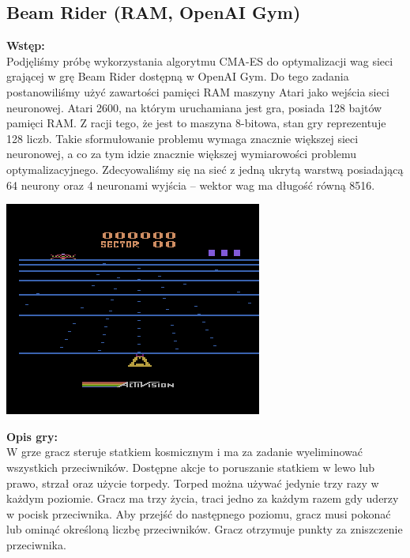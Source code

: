 \documentclass[polish]{article}
\begin{document}
\begin{roboto}
    \section{\textbf{\textcolor{calpolypomonagreen}{Beam Rider (RAM, OpenAI Gym)}}}

    \noindent \textbf{Wstęp:} \\
    Podjęliśmy próbę wykorzystania algorytmu CMA-ES do optymalizacji wag sieci grającej w grę Beam Rider
    dostępną w OpenAI Gym. Do tego zadania postanowiliśmy użyć zawartości pamięci RAM maszyny Atari jako
    wejścia sieci neuronowej. Atari 2600, na którym uruchamiana jest gra, posiada 128 bajtów pamięci RAM.
    Z racji tego, że jest to maszyna 8-bitowa, stan gry reprezentuje 128 liczb. Takie sformułowanie
    problemu wymaga znacznie większej sieci neuronowej, a co za tym idzie znacznie większej wymiarowości
    problemu optymalizacyjnego. Zdecyowaliśmy się na sieć z jedną ukrytą warstwą posiadającą 64 neurony
    oraz 4 neuronami wyjścia -- wektor wag ma długość równą 8516.\\

    \begin{center}\includegraphics{beamrider.png}\end{center}

    \noindent \textbf{Opis gry:}\\ 
    W grze gracz steruje statkiem kosmicznym i ma za zadanie wyeliminować wszystkich przeciwników.
    Dostępne akcje to poruszanie statkiem w lewo lub prawo, strzał oraz użycie torpedy. Torped można
    używać jedynie trzy razy w każdym poziomie. Gracz ma trzy życia, traci jedno za każdym razem gdy 
    uderzy w pocisk przeciwnika. Aby przejść do następnego poziomu, gracz musi pokonać lub ominąć 
    określoną liczbę przeciwników. Gracz otrzymuje punkty za zniszczenie przeciwnika. \\


\end{roboto}
\end{document}
